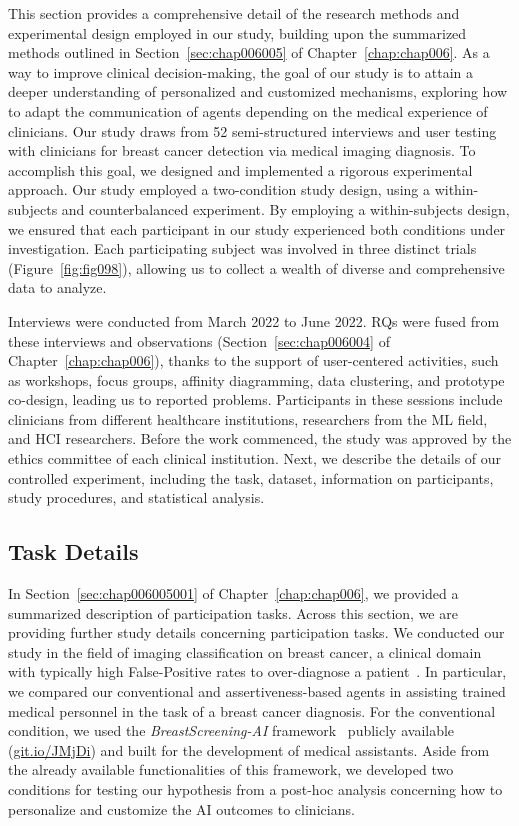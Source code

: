 This section provides a comprehensive detail of the research methods and experimental design employed in our study, building upon the summarized methods outlined in Section~\ref{sec:chap006005} of Chapter~\ref{chap:chap006}.
As a way to improve clinical decision-making, the goal of our study is to attain a deeper understanding of personalized and customized mechanisms, exploring how to adapt the communication of agents depending on the medical experience of clinicians.
Our study draws from 52 semi-structured interviews and user testing with clinicians for breast cancer detection via medical imaging diagnosis.
To accomplish this goal, we designed and implemented a rigorous experimental approach.
Our study employed a two-condition study design, using a within-subjects and counterbalanced experiment.
By employing a within-subjects design, we ensured that each participant in our study experienced both conditions under investigation.
Each participating subject was involved in three distinct trials (Figure~\ref{fig:fig098}), allowing us to collect a wealth of diverse and comprehensive data to analyze.

Interviews were conducted from March 2022 to June 2022.
\acp{RQ} were fused from these interviews and observations (Section~\ref{sec:chap006004} of Chapter~\ref{chap:chap006}), thanks to the support of user-centered activities, such as workshops, focus groups, affinity diagramming, data clustering, and prototype co-design, leading us to reported problems.
Participants in these sessions include clinicians from different healthcare institutions, researchers from the \ac{ML} field, and \ac{HCI} researchers.
Before the work commenced, the study was approved by the ethics committee of each clinical institution.
Next, we describe the details of our controlled experiment, including the task, dataset, information on participants, study procedures, and statistical analysis.

\subsection{Task Details}
\label{sec:app005006001}

In Section~\ref{sec:chap006005001} of Chapter~\ref{chap:chap006}, we provided a summarized description of participation tasks.
Across this section, we are providing further study details concerning participation tasks.
We conducted our study in the field of imaging classification on breast cancer, a clinical domain with typically high False-Positive rates to over-diagnose a patient~\cite{KIM2020e138}.
In particular, we compared our conventional and assertiveness-based agents in assisting trained medical personnel in the task of a breast cancer diagnosis.
For the conventional condition, we used the {\it BreastScreening-AI} framework~\cite{CALISTO2022102285} publicly available (\href{https://mida-project.github.io/prototype-multi-modality-assistant/}{git.io/JMjDi}) and built for the development of medical assistants.
Aside from the already available functionalities of this framework, we developed two conditions for testing our hypothesis from a post-hoc analysis concerning how to personalize and customize the \ac{AI} outcomes to clinicians.

